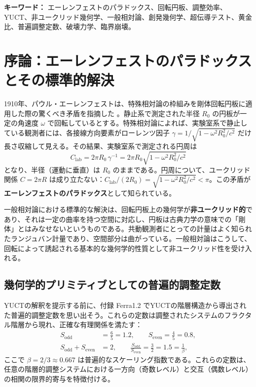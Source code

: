 \documentclass[12pt,a4paper]{article}
\newcommand{\betaf}{\beta}
\newcommand{\Sodd}{S_{\mathrm{odd}}}
\newcommand{\Seven}{S_{\mathrm{even}}}
\begin{document}
\begin{titlepage}
\begin{center}
			\noindent \textbf{キーワード：} エーレンフェストのパラドックス、回転円板、調整効率、YUCT、非ユークリッド幾何学、一般相対論、創発幾何学、超伝導テスト、黄金比、普遍調整定数、破壊力学、臨界崩壊。
		\end{center}
	\end{titlepage}
	
	\tableofcontents
	\newpage
	
	\section{序論：エーレンフェストのパラドックスとその標準的解決}
	\label{sec:intro}
	
	1910年、パウル・エーレンフェストは、特殊相対論の枠組みを剛体回転円板に適用した際の驚くべき矛盾を指摘した \cite{Ehrenfest1909}。静止系で測定された半径 \(R_0\) の円板が一定の角速度 \(\omega\) で回転しているとする。特殊相対論によれば、実験室系で静止している観測者には、各接線方向要素がローレンツ因子 \(\gamma = 1/\sqrt{1 - \omega^2 R_0^2/c^2}\) だけ長さ収縮して見える。その結果、実験室系で測定される円周は
	\[
	C_{\text{lab}} = 2\pi R_0 \, \gamma^{-1} = 2\pi R_0 \sqrt{1 - \omega^2 R_0^2/c^2}
	\]
	となり、半径（運動に垂直）は \(R_0\) のままである。円周について、ユークリッド関係 \(C = 2\pi R\) は成り立たない：\(C_{\text{lab}}/(2R_0) = \sqrt{1 - \omega^2 R_0^2/c^2} < \pi\)。この矛盾が\textbf{エーレンフェストのパラドックス}として知られている。
	
	一般相対論における標準的な解決は、回転円板上の幾何学が\textbf{非ユークリッド的}であり、それは一定の曲率を持つ空間に対応し、円板は古典力学の意味での「剛体」とはみなせないというものである。共動観測者にとっての計量はよく知られたランジュバン計量であり、空間部分は曲がっている。一般相対論はこうして、回転によって誘起される基本的な幾何学的性質として非ユークリッド性を受け入れる。
	
	\subsection{幾何学的プリミティブとしての普遍的調整定数}
	
	YUCTの解釈を提示する前に、付録 Ferra1.2 でYUCTの階層構造から導出された普遍的調整定数を思い出そう。これらの定数は調整されたシステムのフラクタル階層から現れ、正確な有理関係を満たす：
	\begin{align}
		\Sodd &= \frac{6}{5} = 1.2, \qquad \Seven = \frac{4}{5} = 0.8, \\
		\Sodd + \Seven &= 2, \qquad \frac{\Sodd}{\Seven} = \frac{3}{2} = 1.5 = \frac{1}{\betaf},
	\end{align}
	ここで \(\betaf = 2/3 \approx 0.667\) は普遍的なスケーリング指数である。これらの定数は、任意の階層的調整システムにおける一方向（奇数レベル）と交互（偶数レベル）の相関の限界的寄与を特徴付ける。
	
\end{document}
